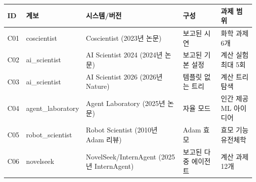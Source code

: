\begin{tabular}{llllp{.25\linewidth}}
\toprule
ID & 계보 & 시스템/버전 & 구성 & 과제 범위 \\
\midrule
C01 & coscientist & Coscientist (2023년 논문) & 보고된 시연 & 화학 과제 6개 \\
C02 & ai\_scientist & AI Scientist 2024 (2024년 논문) & 보고된 기본 설정 & 계산 실험 최대 5회 \\
C03 & ai\_scientist & AI Scientist 2026 (2026년 Nature) & 템플릿 없는 트리 & 계산 트리 탐색 \\
C04 & agent\_laboratory & Agent Laboratory (2025년 논문) & 자율 모드 & 인간 제공 ML 아이디어 \\
C05 & robot\_scientist & Robot Scientist (2010년 Adam 리뷰) & Adam 효모 & 효모 기능유전체학 \\
C06 & novelseek & NovelSeek/InternAgent (2025년 InternAgent) & 보고된 다중 에이전트 & 계산 과제 12개 \\
\bottomrule
\end{tabular}
